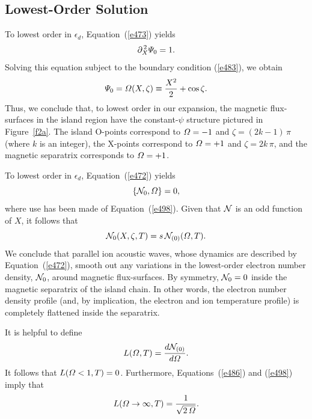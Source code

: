 \documentclass[notitlepage,12pt]{article}
\begin{document}
\subsection{Lowest-Order Solution}
To lowest order in $\epsilon_d$, Equation~(\ref{e473}) yields
\begin{equation}
\partial_X^{\,2}{\mit\Psi}_0 = 1.
\end{equation} 
Solving this equation subject to the boundary condition (\ref{e483}), we obtain
\begin{equation}\label{e498}
{\mit\Psi}_0 = {\mit\Omega}(X,\zeta)\equiv \frac{X^2}{2} + \cos\zeta.
\end{equation}
Thus, we conclude that, to lowest order in our expansion, the magnetic flux-surfaces in the island region have the constant-$\psi$
structure pictured in Figure~\ref{f2a}. The island O-points correspond to ${\mit\Omega}=-1$ and $\zeta=(2k-1)\,\pi$ (where $k$ is an integer), the
X-points correspond to ${\mit\Omega}=+1$ and $\zeta = 2k\,\pi$, and the magnetic separatrix corresponds to 
${\mit\Omega}=+1$. 

To lowest order in $\epsilon_d$, Equation~(\ref{e472}) yields
\begin{equation}
\{{\cal N}_0, {\mit\Omega}\}= 0,
\end{equation}
where use has been made of Equation~(\ref{e498}). Given that ${\cal N}$ is an odd function of $X$, it
follows that
\begin{equation}\label{e500}
{\cal N}_0(X,\zeta,T) = s\, {\cal N}_{(0)}({\mit\Omega},T).
\end{equation}
We conclude that parallel
ion acoustic waves, whose dynamics are described by Equation~(\ref{e472}),  smooth  out
any variations in the lowest-order electron number density, ${\cal N}_0$,  around magnetic flux-surfaces. 
By symmetry, ${\cal N}_{0}=0$ inside the magnetic separatrix of the island chain. In other words, the electron number
density profile (and, by implication, the electron and ion temperature profile) is completely flattened inside 
the  separatrix. 

It is helpful to define
\begin{equation}\label{e501}
L({\mit\Omega},T) = \frac{d{\cal N}_{(0)}}{d{\mit\Omega}}.
\end{equation}
It follows that $L({\mit\Omega}<1,T)=0$. Furthermore, Equations~(\ref{e486}) and (\ref{e498}) imply that
\begin{equation}\label{e502}
L({\mit\Omega}\rightarrow\infty,T) = \frac{1}{\sqrt{2\,{\mit\Omega}}}.
\end{equation}
\end{document}
